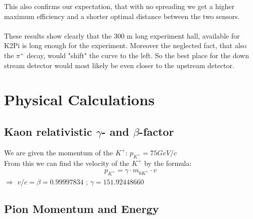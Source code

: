 \documentclass[a4paper,parskip,11pt, DIV12]{scrreprt}
\begin{document}
	This also confirms our expectation, that with no spreading we get a higher maximum efficiency and a shorter optimal distance between the two sensors.
	\\
	\\
	These results show clearly that the 300 m long experiment hall, available for K2Pi is long enough for the experiment. Moreover the neglected fact, that also the $\pi^+$ decay, would "shift" the curve to the left. So the best place for the down stream detector would most likely be even closer to the upstream detector. 
	\clearpage
	
	\chapter{Physical Calculations}
	
	\section{Kaon relativistic $\gamma$- and $\beta$-factor} \label{sec:gammabeta}
	
	We are given the momentum of the $K^+$: $p_{K^+} = 75 GeV/c$\\
	From this we can find the velocity of the $K^+$ by the formula:
	\begin{align*}
		p_{K^+} = \gamma \cdot m_{0K^+} \cdot v
	\end{align*}
	$\Rightarrow$
	$v/c = \beta = 0.99997834$ ;
	$\gamma = 151.92448660$\\
	
	\section{Pion Momentum and Energy} \label{sec:pE}
	
\end{document}
